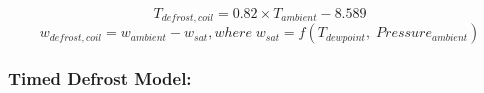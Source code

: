 \begin{equation}
T_{defrost, coil} = {0.82 \times T_{ambient} - 8.589}
\end{equation}
\begin{equation}
{w_{defrost, coil} = w_{ambient} - w_{sat}}, where\; {w_{sat} = f(T_{dewpoint},\; Pressure_{ambient})}
\end{equation}

\subsubsection*{Timed Defrost Model:}\label{eir-air-to-water-heat-pumps-timed-defrost}

